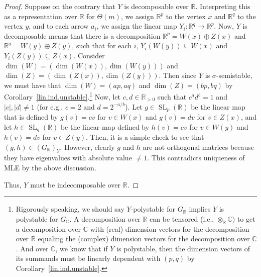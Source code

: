 \documentclass[11pt]{amsart}
\theoremstyle{definition}
\newcommand{\R}{{\mathbb R}}
\newcommand{\C}{{\mathbb C}}
\newcommand{\SL}{\operatorname{SL}}
\begin{document}
\begin{proof}
Suppose on the contrary that $Y$ is decomposable over $\R$. Interpreting this as a representation over $\R$ for $\Theta(m)$, we assign $\R^p$ to the vertex $x$ and $\R^q$ to the vertex $y$, and to each arrow $a_i$, we assign the linear map $Y_i: \R^q \rightarrow \R^p$. Now, $Y$ is decomposable means that there is a decomposition $\R^p = W(x) \oplus Z(x)$ and $\R^q = W(y) \oplus Z(y)$, such that for each $i$, $Y_i(W(y)) \subseteq W(x)$ and $Y_i(Z(y)) \subseteq Z(x)$. Consider $\dim(W) = (\dim(W(x)),\dim(W(y)))$ and $\dim(Z)  = (\dim(Z(x)),\dim(Z(y)))$. Then since $Y$ is $\sigma$-semistable, we must have that $\dim(W) = (ap,aq)$ and $\dim(Z) = (bp,bq)$ by Corollary~\ref{lin.ind.unstable}.\footnote{Rigorously speaking, we should say $Y$-polystable for $G_\R$ implies $Y$ is polystable for $G_\C$. A decomposition over $\R$ can be tensored (i.e., $\otimes_\R \C)$ to get a decomposition over $\C$ with (real) dimension vectors for the decomposition over $\R$ equaling the (complex) dimension vectors for the decomposition over $\C$. And over $\C$, we know that if $Y$ is polystable, then the dimension vectors of its summands must be linearly dependent with $(p,q)$ by Corollary~\ref{lin.ind.unstable}.} Now, let $c,d \in \R_{>0}$ such that $c^ad^b = 1$ and $|c|, |d| \neq 1$ (for e.g., $c = 2$ and $d = 2^{-a/b}$). Let $g \in \SL_p(\R)$ be the linear map that is defined by $g(v) = c v$ for $v \in W(x)$ and $g(v) = dv$ for $v \in Z(x)$, and let $h \in \SL_q(\R)$ be the linear map defined by $h(v) = cv$ for $v \in W(y)$ and $h(v) = dv$ for $v \in Z(y)$. Then, it is a simple check to see that $(g,h) \in (G_\R)_Y$. However, clearly $g$ and $h$ are not orthogonal matrices because they have eigenvalues with absolute value $\neq 1$. This contradicts uniqueness of MLE by the above discussion.




Thus, $Y$ must be indecomposable over $\R$.


\end{proof}
\end{document}
